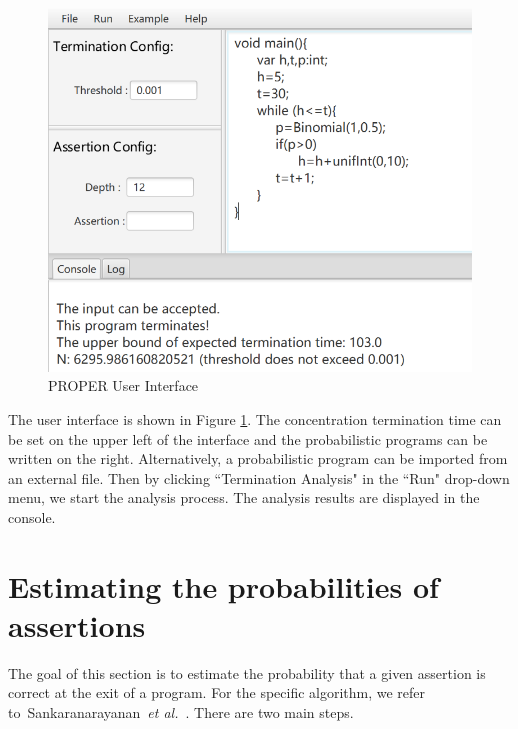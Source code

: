 \documentclass[sigconf,review, anonymous]{acmart}
\begin{document}
\begin{figure}[h]
	\centering
	\includegraphics[scale=0.6]{img/interface}
	\caption{PROPER User Interface}
	\label{interface}
\end{figure}

The user interface is shown in Figure \ref{interface}. The concentration termination time can be set on the upper left of the interface and the probabilistic programs can be written on the right. Alternatively, a probabilistic program  can be imported from an external file. 
Then by clicking ``Termination Analysis" in the ``Run" drop-down menu, we start the analysis process. The analysis results are displayed in the console. 


\section{Estimating the probabilities of assertions}
The goal of this section is to estimate the probability that a given assertion is correct at the exit of a program. For the specific algorithm, we refer to~Sankaranarayanan~\emph{et al.}~\cite{Sankaranarayanan2013Static}. There are two main steps.
\end{document}
